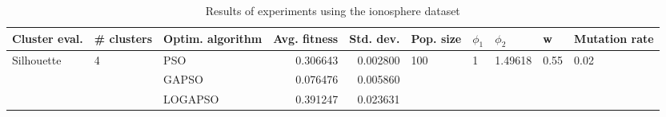 \begin{table}
\centering
\caption{Results of experiments using the ionosphere dataset}
\begin{tabular}{lllrrlllll}
\toprule
              Cluster eval. &        \# clusters & Optim. algorithm &  Avg. fitness &  Std. dev. &            Pop. size &         $\phi_{1}$ &               $\phi_{2}$ &                     w &         Mutation rate \\
\midrule
\multirow{3}{*}{Silhouette} & \multirow{3}{*}{4} &              PSO &      0.306643 &   0.002800 & \multirow{3}{*}{100} & \multirow{3}{*}{1} & \multirow{3}{*}{1.49618} & \multirow{3}{*}{0.55} & \multirow{3}{*}{0.02} \\
                            &                    &            GAPSO &      0.076476 &   0.005860 &                      &                    &                          &                       &                       \\
                            &                    &          LOGAPSO &      0.391247 &   0.023631 &                      &                    &                          &                       &                       \\
\bottomrule
\end{tabular}
\end{table}
